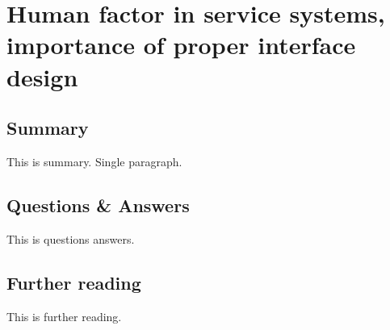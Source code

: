 \section{Human factor in service systems, importance of proper interface design}

\subsection{Summary}
This is summary. Single paragraph.

\subsection{Questions \& Answers}
This is questions answers.

\subsection{Further reading}
This is further reading.
